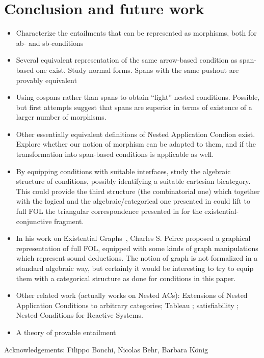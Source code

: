 \section{Conclusion and future work}

\begin{itemize}
    \item Characterize the entailments that can be represented as morphisms, both for ab- and sb-conditions
    \item Several equivalent representation of the same arrow-based condition as span-based one exist. Study normal forms. Spans with the same pushout are provably equivalent
\item Using cospans rather than spans to obtain ``light'' nested conditions. Possible, but first attempts suggest that spans are superior in terms of existence of a larger number of morphisms.
\item Other essentially equivalent definitions of Nested Application Condion exist. Explore whether our notion of morphism can be adapted to them, and if the transformation into span-based conditions is applicable as well.
\item By equipping conditions with suitable interfaces, study the algebraic structure of conditions, possibly identifying a suitable cartesian bicategory. This could provide the third structure (the combinatorial one) which together with the logical and the algebraic/categorical one presented in \cite{DBLP:journals/corr/abs-2404-18795} could lift to full FOL the triangular correspondence presented in \cite{DBLP:conf/csl/BonchiSS18} for the existential-conjunctive fragment.
\item In his work on Existential Graphs~\cite{roberts1973-the-existential-graphs-of-charles-s.-peirce}, Charles S. Peirce proposed a graphical representation of full FOL, equipped with some kinds of graph manipulations which represent sound deductions. The notion of graph is not formalized in a standard algebraic way, but certainly it would be interesting to try to equip them with a categorical structure as done for conditions in this paper.  
\item Other related work (actually works on Nested ACs): Extensions of Nested Application Conditions to arbitrary categories; Tableau%
; satisfiability%
; Nested Conditions for Reactive Systems. 
\item A theory of provable entailment
\end{itemize}
%
Acknowledgements: Filippo Bonchi, Nicolas Behr, Barbara König
